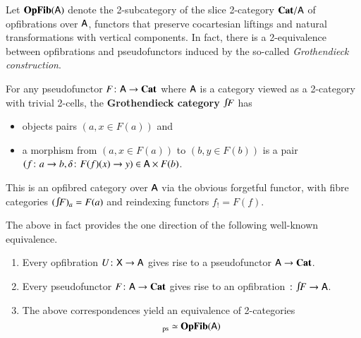 \documentclass[reqno]{amsart}
\begin{document}
Let $\mathbf{OpFib}(\mathsf{A})$ denote the 2-subcategory of the slice 2-category $\mathbf{Cat}/ \mathsf{A}$ of opfibrations over $\mathsf{A}$, functors that preserve cocartesian liftings and natural transformations with vertical components. In fact, there is a 2-equivalence between opfibrations and pseudofunctors induced by the so-called \emph{Grothendieck construction}. 
\begin{defn}\label{def:GrothCat}
For any pseudofunctor $F\colon\mathsf{A}\to\mathbf{Cat}$ where $\mathsf{A}$ is a category viewed as a 2-category with trivial 2-cells, the \textbf{Grothendieck category}
$\inta F$ has
\begin{itemize}
\item objects pairs $(a, x \in F(a))$ and
\item a morphism from $(a, x \in F(a))$ to $(b, y\in F(b))$ is a pair $(f \colon a \to b,\delta \colon F(f)(x) \to y)\in\mathsf{A}\times F(b)$.
\end{itemize}
This is an opfibred category over $\mathsf{A}$ via the obvious forgetful functor, with fibre categories $(\inta F)_a=F(a)$ and reindexing functors $f_!=F(f)$.
\end{defn}
The above in fact provides the one direction of the following well-known equivalence.

\begin{thm}\label{thm:Grothendieck}\hfill
    \begin{enumerate}
        \item Every opfibration $U \colon \mathsf{X} \to \mathsf{A}$ gives rise to a pseudofunctor $\mathsf{A} \to \mathbf{Cat}$.
        \item Every pseudofunctor $F \colon \mathsf{A} \to \mathbf{Cat}$ gives rise to  an opfibration $\maps \inta F\to\A$.
        \item The above correspondences yield an equivalence of 2-categories 
        \begin{displaymath}
            [\A,\Cat]_\pse \simeq \OpFib(\A)
        \end{displaymath}
    \end{enumerate}
\end{thm}
\end{document}
